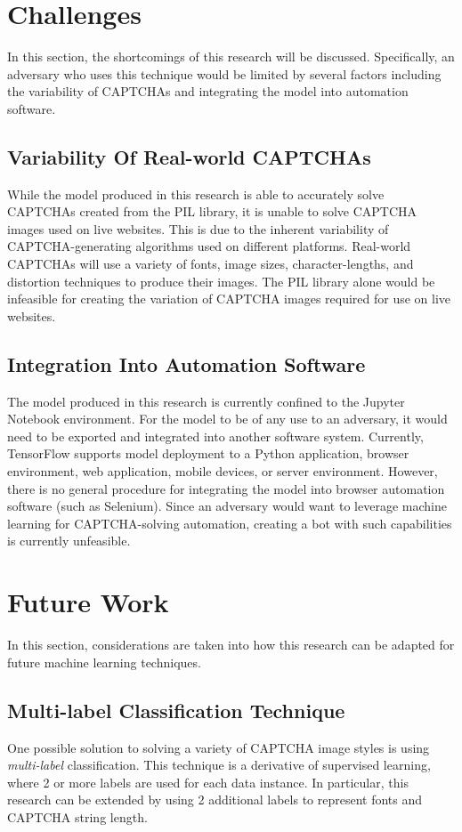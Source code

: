 \documentclass[11pt,conference]{IEEEtran}
\begin{document}
\section{Challenges}
In this section, the shortcomings of this research will be discussed.
Specifically, an adversary who uses this technique would be limited by several
factors including the variability of CAPTCHAs and integrating the model into automation software.

\subsection{Variability Of Real-world CAPTCHAs}
While the model produced in this research is able to accurately solve CAPTCHAs created
from the PIL library, it is unable to solve CAPTCHA images
used on live websites. This is due to the inherent variability of
CAPTCHA-generating algorithms used on different platforms. Real-world CAPTCHAs
will use a variety of fonts, image sizes, character-lengths, and distortion
techniques to produce their images. The PIL library alone would be infeasible
for creating the variation of CAPTCHA images required for use on live websites.

\subsection{Integration Into Automation Software}
The model produced in this research is currently confined to the Jupyter
Notebook environment. For the model to be of any use to an adversary, it would
need to be exported and integrated into another software system. Currently,
TensorFlow supports model deployment to a Python application,
browser environment, web application, mobile devices, or server environment.
However, there is no general procedure for integrating the model into
browser automation software (such as Selenium). Since an adversary would want
to leverage machine learning for CAPTCHA-solving automation, creating a bot
with such capabilities is currently unfeasible.

\section{Future Work}
In this section, considerations are taken into how this research can be adapted
for future machine learning techniques.

\subsection{Multi-label Classification Technique}
One possible solution to solving a variety of CAPTCHA image styles is using 
\emph{multi-label} classification. This technique is a derivative of supervised
learning, where 2 or more labels are used for each data instance. In
particular, this research can be extended by using 2 additional labels to
represent fonts and CAPTCHA string length.
\end{document}

